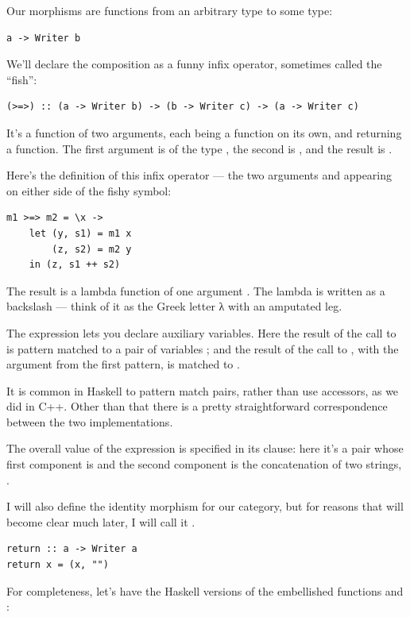 Our morphisms are functions from an arbitrary type to some
 type:

\begin{Verbatim}[commandchars=\\\{\}]
a -> Writer b
\end{Verbatim}
We'll declare the composition as a funny infix operator, sometimes
called the ``fish'':

\begin{Verbatim}[commandchars=\\\{\}]
(>=>) :: (a -> Writer b) -> (b -> Writer c) -> (a -> Writer c)
\end{Verbatim}
It's a function of two arguments, each being a function on its own, and
returning a function. The first argument is of the type
, the second is
, and the result is
.

Here's the definition of this infix operator --- the two arguments
 and  appearing on either side of the fishy
symbol:

\begin{Verbatim}
m1 >=> m2 = \x ->
    let (y, s1) = m1 x
        (z, s2) = m2 y
    in (z, s1 ++ s2)
\end{Verbatim}
The result is a lambda function of one argument . The lambda
is written as a backslash --- think of it as the Greek letter λ with an
amputated leg.

The  expression lets you declare auxiliary variables. Here
the result of the call to  is pattern matched to a pair of
variables ; and the result of the call to ,
with the argument  from the first pattern, is matched to
.

It is common in Haskell to pattern match pairs, rather than use
accessors, as we did in C++. Other than that there is a pretty
straightforward correspondence between the two implementations.

The overall value of the  expression is specified in its
 clause: here it's a pair whose first component is 
and the second component is the concatenation of two strings,
.

I will also define the identity morphism for our category, but for
reasons that will become clear much later, I will call it
.

\begin{Verbatim}[commandchars=\\\{\}]
return :: a -> Writer a
return x = (x, "")
\end{Verbatim}
For completeness, let's have the Haskell versions of the embellished
functions  and :

